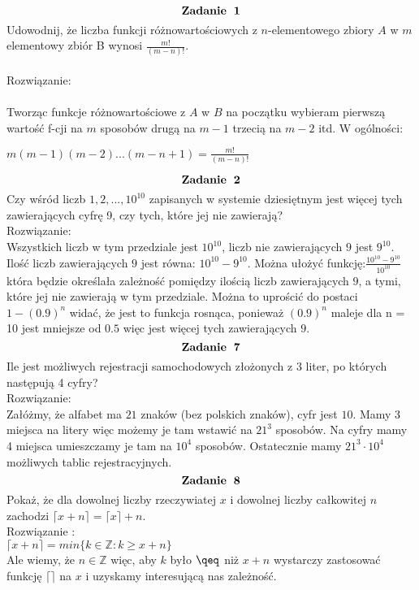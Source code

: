 \documentclass[fleqn]{article}
\author{Michał Bronikowski}
\begin{document}
\hfill
\\
\\
\\
\\
\\
\\
\[\huge \bf Zadanie \ 1\] 
Udowodnij, że liczba funkcji różnowartościowych z $n$-elementowego zbiory $A$ w $m$ elementowy zbiór B wynosi $\frac{m!}{(m-n)!} $. \\
\\Rozwiązanie: \\ \\
Tworząc funkcje różnowartościowe z $A$ w $B$ na początku wybieram pierwszą wartość f-cji na $m$ sposobów drugą na $m-1$ trzecią na $m-2$ itd. W ogólności: \\ 
\begin{center}
$
m(m-1)(m-2)...(m-n+1) = \frac{m!}{(m-n)!} 
$
\end{center}

 \[\huge \bf Zadanie \ 2\] 
Czy wśród liczb $1,2,...,10^{10}$ zapisanych w systemie dziesiętnym jest więcej tych zawierających cyfrę 9, czy tych, które jej nie zawierają?
\newline \\
Rozwiązanie:
\newline \\
Wszystkich liczb w tym przedziale jest $10^{10}$, liczb nie zawierających $9$ jest $9^{10}$. Ilość liczb zawierających $9$ jest równa: $10^{10} - 9^{10} $. Można ułożyć funkcję:$\frac{10^{10} - 9^{10}}{10^{10}}$
która będzie określała zależność pomiędzy ilością liczb zawierających $9$, a tymi, które jej nie zawierają w tym przedziale. Można to uprościć do postaci $ 1 - (0.9)^{n} $ widać, że jest to funkcja rosnąca, ponieważ $(0.9)^{n}$ maleje dla n = 10 jest mniejsze od $0.5$ więc jest więcej tych zawierających $9$.
 \newpage
 \[\huge \bf Zadanie \ 7\] 
Ile jest możliwych rejestracji samochodowych złożonych z 3 liter, po których następują 4 cyfry?
\newline \\
Rozwiązanie:
\newline \\
Załóżmy, że alfabet ma $21$ znaków (bez polskich znaków), cyfr jest $10$.
Mamy 3 miejsca na litery więc możemy je tam wstawić na $21^{3}$ sposobów. Na cyfry mamy 4 miejsca umieszczamy je tam na $10^{4}$ sposobów.
Ostatecznie mamy $21^{3} \cdot 10^{4} $ możliwych tablic rejestracyjnych.
\[\huge \bf Zadanie \ 8\]
Pokaż, że dla dowolnej liczby rzeczywiatej $x$ i dowolnej liczby całkowitej $n$ zachodzi $ \lceil x + n \rceil = \lceil x \rceil + n$.
\newline \\
Rozwiązanie :
\newline \\
$ \lceil x + n \rceil = min \{ k \in \mathbb{Z} : k \geq x + n \}$
\\Ale wiemy, że $ n \in \mathbb{Z} $ więc, aby $k$ było $\qeq$ niż $x+n$ wystarczy zastosować funkcję $\lceil\rceil$ na $x$ i uzyskamy interesującą nas zależność.
\end{document}
